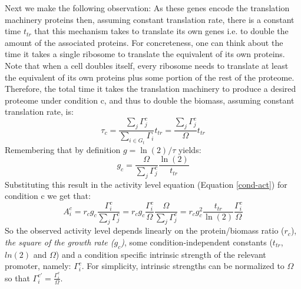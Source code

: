 \documentclass[a4page,notitlepage]{article}
\begin{document}
Next we make the following observation:
As these genes encode the translation machinery proteins then, assuming constant translation rate, there is a constant time $t_{tr}$ that this mechanism takes to translate its own genes i.e. to double the amount of the associated proteins.
For concreteness, one can think about the time it takes a single ribosome to translate the equivalent of its own proteins.
Note that when a cell doubles itself, every ribosome needs to translate at least the equivalent of its own proteins plus some portion of the rest of the proteome.
Therefore, the total time it takes the translation machinery to produce a desired proteome under condition c, and thus to double the biomass, assuming constant translation rate, is:
\[\tau_c=\frac{\sum_{j}\Gamma^c_j}{\sum_{i \in G_t}\Gamma_i}t_{tr}=\frac{\sum_{j}\Gamma^c_j}{\Omega}t_{tr}\]
Remembering that by  definition $g=\ln(2)/\tau$ yields:
\[g_c=\frac{\Omega}{\sum_{j}\Gamma^c_j}\frac{\ln(2)}{t_{tr}}\]
Substituting this result in the activity level equation (Equation \ref{cond-act}) for condition c we get that:
\begin{equation}
\label{ind-act}
A^c_i=r_c g_c \frac{\Gamma^c_i}{\sum_{j}\Gamma^c_j}=r_c g_c \frac{\Gamma^c_i}{\Omega}\frac{\Omega}{\sum_{j}\Gamma^c_j}=r_c g_c^2\frac{t_{tr}}{\ln(2)}\frac{\Gamma^c_i}{\Omega}
\end{equation}
So the observed activity level depends linearly on the protein/biomass ratio ($r_c$), \emph{the square of the growth rate ($g_c$)}, some condition-independent constants ($t_{tr}$, $ln(2)$ and $\Omega$) and a condition specific intrinsic strength of the relevant promoter, namely: ${\Gamma^c_i}$.
For simplicity, intrinsic strengths can be normalized to $\Omega$ so that $\Gamma_i^{c'} = \frac{\Gamma^c_i}{\Omega}$.
\end{document}
